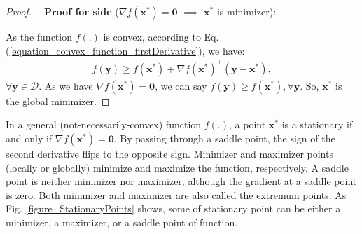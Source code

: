 \documentclass[lang=cn,10pt]{gorgeousnbook}
\numberwithin{equation}{section}%
\numberwithin{figure}{section}%
\begin{document}
\begin{proof}
\textbf{-- Proof for side} ($\nabla f(\boldsymbol{x}^*) = \boldsymbol{0}$ $\implies$ $\boldsymbol{x}^*$ is minimizer):

As the function $f(.)$ is convex, according to Eq. (\ref{equation_convex_function_firstDerivative}), we have:
\begin{align*}
f(\boldsymbol{y}) \geq f(\boldsymbol{x}^*) + \nabla f(\boldsymbol{x}^*)^\top (\boldsymbol{y} - \boldsymbol{x}^*),
\end{align*}
$\forall \boldsymbol{y} \in \mathcal{D}$. As we have $\nabla f(\boldsymbol{x}^*) = \boldsymbol{0}$, we can say $f(\boldsymbol{y}) \geq f(\boldsymbol{x}^*), \forall \boldsymbol{y}$. So, $\boldsymbol{x}^*$ is the global minimizer.
\end{proof}

\begin{definition}
In a general (not-necessarily-convex) function $f(.)$, a point $\boldsymbol{x}^*$ is a stationary if and only if $\nabla f(\boldsymbol{x}^*) = \boldsymbol{0}$. 
By passing through a saddle point, the sign of the second derivative flips to the opposite sign.  
Minimizer and maximizer points (locally or globally) minimize and maximize the function, respectively. A saddle point is neither minimizer nor maximizer, although the gradient at a saddle point is zero. 
Both minimizer and maximizer are also called the extremum points. 
As Fig. \ref{figure_StationaryPoints} shows, some of  stationary point can be either a minimizer, a maximizer, or a saddle point of function.
\end{definition}
\end{document}
